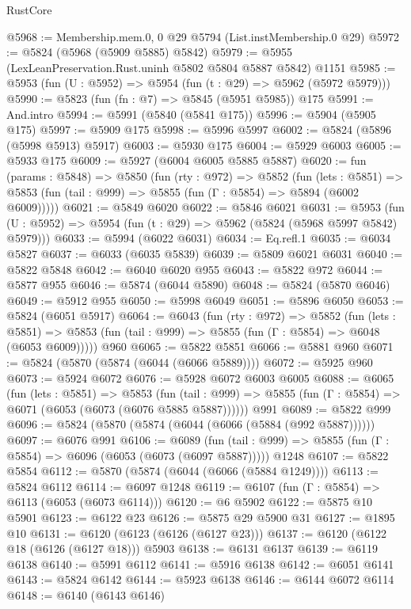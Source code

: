 \begin{lexlean}{RustCore}
\begin{coremodule}
@5968 := Membership.mem.{0, 0} @29 @5794 (List.instMembership.{0} @29)
@5972 := @5824 (@5968 (@5909 @5885) @5842)
@5979 := @5955 (LexLeanPreservation.Rust.uninh @5802 @5804 @5887 @5842) @1151
@5985 := @5953 (fun (U : @5952) => @5954 (fun (t : @29) => @5962 (@5972 @5979)))
@5990 := @5823 (fun (fn : @7) => @5845 (@5951 @5985)) @175
@5991 := And.intro
@5994 := @5991 (@5840 (@5841 @175))
@5996 := @5904 (@5905 @175)
@5997 := @5909 @175
@5998 := @5996 @5997
@6002 := @5824 (@5896 (@5998 @5913) @5917)
@6003 := @5930 @175
@6004 := @5929 @6003
@6005 := @5933 @175
@6009 := @5927 (@6004 @6005 @5885 @5887)
@6020 := fun (params : @5848) =>
  @5850
    (fun (rty : @972) =>
    @5852
      (fun (lets : @5851) =>
      @5853 (fun (tail : @999) => @5855 (fun (Γ : @5854) => @5894 (@6002 @6009)))))
@6021 := @5849 @6020
@6022 := @5846 @6021
@6031 := @5953 (fun (U : @5952) => @5954 (fun (t : @29) => @5962 (@5824 (@5968 @5997 @5842) @5979)))
@6033 := @5994 (@6022 @6031)
@6034 := Eq.refl.{1}
@6035 := @6034 @5827
@6037 := @6033 (@6035 @5839)
@6039 := @5809 @6021 @6031
@6040 := @5822 @5848
@6042 := @6040 @6020 @955
@6043 := @5822 @972
@6044 := @5877 @955
@6046 := @5874 (@6044 @5890)
@6048 := @5824 (@5870 @6046)
@6049 := @5912 @955
@6050 := @5998 @6049
@6051 := @5896 @6050
@6053 := @5824 (@6051 @5917)
@6064 := @6043
    (fun (rty : @972) =>
    @5852
      (fun (lets : @5851) =>
      @5853 (fun (tail : @999) => @5855 (fun (Γ : @5854) => @6048 (@6053 @6009)))))
    @960
@6065 := @5822 @5851
@6066 := @5881 @960
@6071 := @5824 (@5870 (@5874 (@6044 (@6066 @5889))))
@6072 := @5925 @960
@6073 := @5924 @6072
@6076 := @5928 @6072 @6003 @6005
@6088 := @6065
    (fun (lets : @5851) =>
    @5853
      (fun (tail : @999) => @5855 (fun (Γ : @5854) => @6071 (@6053 (@6073 (@6076 @5885 @5887))))))
    @991
@6089 := @5822 @999
@6096 := @5824 (@5870 (@5874 (@6044 (@6066 (@5884 (@992 @5887))))))
@6097 := @6076 @991
@6106 := @6089
    (fun (tail : @999) => @5855 (fun (Γ : @5854) => @6096 (@6053 (@6073 (@6097 @5887)))))
    @1248
@6107 := @5822 @5854
@6112 := @5870 (@5874 (@6044 (@6066 (@5884 @1249))))
@6113 := @5824 @6112
@6114 := @6097 @1248
@6119 := @6107 (fun (Γ : @5854) => @6113 (@6053 (@6073 @6114)))
@6120 := @6 @5902
@6122 := @5875 @10 @5901
@6123 := @6122 @23
@6126 := @5875 @29 @5900 @31
@6127 := @1895 @10
@6131 := @6120 (@6123 (@6126 (@6127 @23)))
@6137 := @6120 (@6122 @18 (@6126 (@6127 @18))) @5903
@6138 := @6131 @6137
@6139 := @6119 @6138
@6140 := @5991 @6112
@6141 := @5916 @6138
@6142 := @6051 @6141
@6143 := @5824 @6142
@6144 := @5923 @6138
@6146 := @6144 @6072 @6114
@6148 := @6140 (@6143 @6146)

\end{coremodule}
\end{lexlean}
